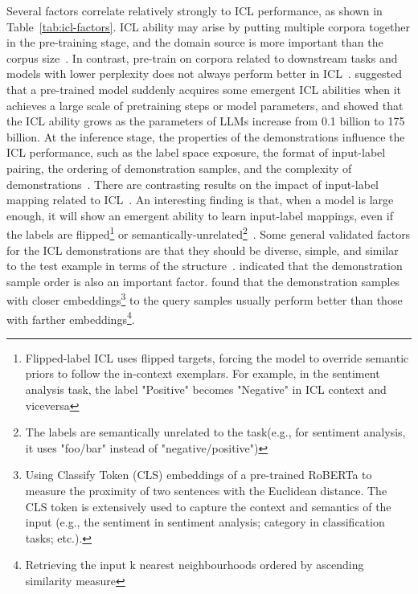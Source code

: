 Several factors correlate relatively strongly to ICL performance, as shown in Table~\ref{tab:icl-factors}.
ICL ability may arise by putting multiple corpora together in the pre-training stage, and the domain source is more important than the corpus size~\cite{shin2022effect}.
In contrast, pre-train on corpora related to downstream tasks and models with lower perplexity does not always perform better in ICL~\cite{shin2022effect}.
\textcite{wei2022emergent} suggested that a pre-trained model suddenly acquires some emergent ICL abilities when it achieves a large scale of pretraining steps or model parameters, and \textcite{brown2020language} showed that the ICL ability grows as the parameters of LLMs increase from 0.1 billion to 175 billion.
At the inference stage, the properties of the demonstrations influence the ICL performance, such as the label space exposure, the format of input-label pairing, the ordering of demonstration samples, and the complexity of demonstrations~\cite{min2022rethinking, an2023how, lu2022fantastically}.
There are contrasting results on the impact of input-label mapping related to ICL~\cite{min2022rethinking, yoo2022groundtruth}.
An interesting finding is that, when a model is large enough, it will show an emergent ability to learn input-label mappings, even if the labels are flipped\footnote{Flipped-label ICL uses flipped targets, forcing the model to override semantic priors to follow the in-context exemplars. For example, in the sentiment analysis task, the label "Positive" becomes "Negative" in ICL context and viceversa} or semantically-unrelated\footnote{The labels are semantically unrelated to the task(e.g., for sentiment analysis, it uses "foo/bar" instead of "negative/positive")}~\cite{wei2023larger}.
Some general validated factors for the ICL demonstrations are that they should be diverse, simple, and similar to the test example in terms of the structure~\cite{an2023how}.
\textcite{lu2022fantastically} indicated that the demonstration sample order is also an important factor.
\textcite{liu2022good} found that the demonstration samples with closer embeddings\footnote{Using Classify Token (CLS) embeddings of a pre-trained RoBERTa to measure the proximity of two sentences with the Euclidean distance. The CLS token is extensively used to capture the context and semantics of the input (e.g., the sentiment in  sentiment analysis; category in classification tasks; etc.).} to the query samples usually perform better than those with farther embeddings\footnote{Retrieving the input k nearest neighbourhoods ordered by ascending similarity measure}.

